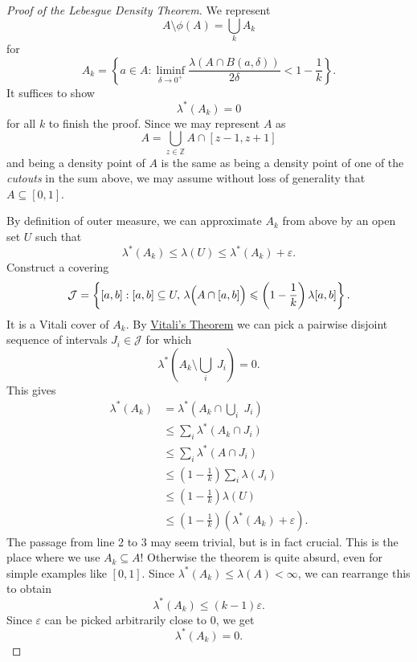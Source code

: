 \begin{proof}[Proof of the Lebesgue Density Theorem]
    We represent
    \[ 
    A \setminus \phi(A) = \bigcup_k A_k      
   \]
   for
   \[ 
       A_k = \left\{ a \in A : \liminf_{\delta \to 0^+} \frac{\lambda(A \cap B(a,\delta))}{2\delta} < 1 - \frac{1}{k} \right\}.
  \]
  It suffices to show
  \[ 
     \lambda^*(A_k) = 0 
 \]
 for all \( k \) to finish the proof. Since we may represent \( A \) as
 \[ 
     A = \bigcup_{z \in \mathbb{Z}} A \cap [z-1, z+1] 
\]
and being a density point of \( A \) is the same as being a density point of one of the \emph{cutouts} in the sum above, we may assume without loss of generality that \( A \subseteq [0,1] \).

By definition of outer measure, we can approximate \( A_k \) from above by an open set \( U \) such that
\[ 
    \lambda^*(A_k) \leqslant \lambda(U) \leqslant \lambda^*(A_k) + \varepsilon.
\]
Construct a covering
\[ 
    \mathcal{J} = \left\{ [a,b] : [a,b] \subseteq U,\,\lambda\Bigl(A \cap [a,b]\Bigr) \leqslant \left(1 - \frac{1}{k}\right)\lambda[a,b]\right\}.
\]
It is a Vitali cover of \( A_k \). By \hyperlink{VitaliCoveringTheorem}{Vitali's Theorem} we can pick a pairwise disjoint sequence of intervals \( J_i \in \mathcal{J}\) for which
\[ 
    \lambda^*\left( A_k \setminus \bigcup_i\; J_i\right) = 0.
\]
This gives
\begin{align*}
    \lambda^* (A_k) &=\lambda^*\left(A_k \cap \bigcup_i \; J_i \right) \\
                    &\leqslant \sum_i \lambda^*(A_k \cap J_i ) \\
                    &\leqslant \sum_i \lambda^*(A \cap J_i ) \\
                    &\leqslant \left( 1 - \frac{1}{k} \right) \sum_i\lambda(J_i) \\
                    &\leqslant \left( 1 - \frac{1}{k} \right)\lambda(U) \\
                    &\leqslant \left( 1 - \frac{1}{k} \right) \left(\lambda^*(A_k) +\varepsilon \right).
\end{align*}
The passage from line 2 to 3 may seem trivial, but is in fact crucial. This is the place where we use \( A_k \subseteq A \)! Otherwise the theorem is quite absurd, even for simple examples like \( [0,1] \). Since \( \lambda^*(A_k) \leqslant\lambda(A) < \infty \), we can rearrange this to obtain
\[ 
   \lambda^*(A_k) \leqslant (k-1)\varepsilon. 
\]
Since \(\varepsilon \) can be picked arbitrarily close to 0, we get
\[ 
   \lambda^*(A_k) = 0. 
\]

\end{proof}

